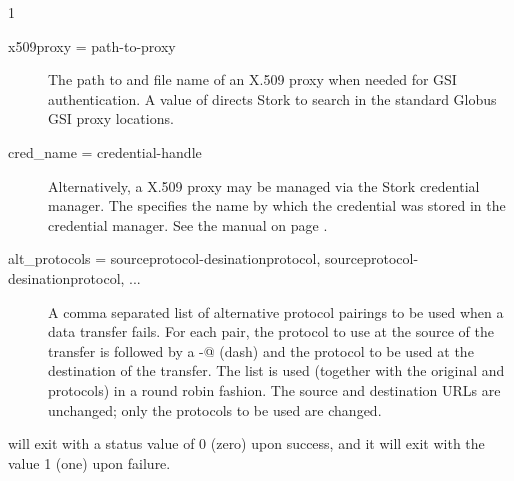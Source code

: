 \begin{ManPage}{\label{man-stork-submit}}{1}
\begin{description}


\item[x509proxy = \lt{}path-to-proxy\gt{}]
The path to and file name of an X.509 proxy when needed
for GSI authentication.  A value of  directs Stork to
search in the standard Globus GSI proxy locations.

\item[cred\_name = \lt{}credential-handle\gt{}]
Alternatively, a X.509 proxy may be managed via the Stork credential manager.
The  specifies the name by which the credential was
stored in the credential manager.  See the 
 manual on page \pageref{man-stork-store-cred}.

\item[alt\_protocols = \lt{}sourceprotocol-desinationprotocol, sourceprotocol-desinationprotocol, ...\gt{}]
A comma separated list of alternative protocol pairings to be used
when a data transfer fails.
For each pair, the protocol to use at the source of the transfer
is followed by a \verb@-@ (dash) and the protocol to be used
at the destination of the transfer.
The list is used
(together with the original 
and  protocols)
in a round robin fashion.
The source and destination URLs are unchanged;
only the protocols to be used are changed.


\end{description}


\begin{Options}
  \ToolArgsBaseDesc
  \StorknameDesc
\end{Options}

\ExitStatus

 will exit with a status value of 0 (zero) upon success,
and it will exit with the value 1 (one) upon failure.

\end{ManPage}
